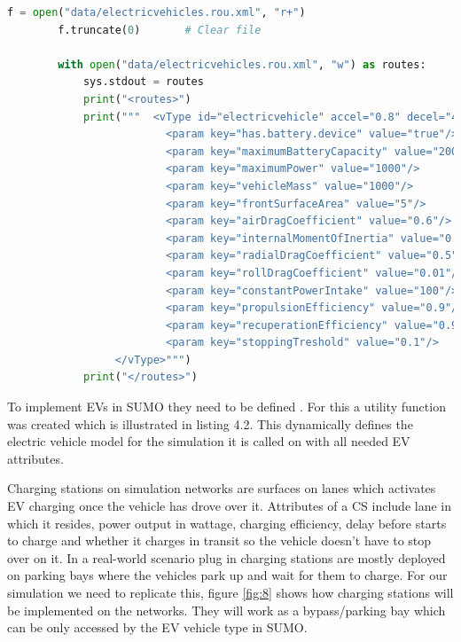 \documentclass[11pt]{report}
\begin{document}
\begin{lstlisting}[language=Python, caption=Utility function to define definition EVs]
        f = open("data/electricvehicles.rou.xml", "r+")
        f.truncate(0)       # Clear file
    
        with open("data/electricvehicles.rou.xml", "w") as routes:
            sys.stdout = routes
            print("<routes>")
            print("""  <vType id="electricvehicle" accel="0.8" decel="4.5" sigma="0.5" emissionClass="Energy/unknown" minGap="2.5" maxSpeed="40" guiShape="evehicle" vClass="evehicle">
                         <param key="has.battery.device" value="true"/>
                         <param key="maximumBatteryCapacity" value="2000"/>
                         <param key="maximumPower" value="1000"/>
                         <param key="vehicleMass" value="1000"/>
                         <param key="frontSurfaceArea" value="5"/>
                         <param key="airDragCoefficient" value="0.6"/>
                         <param key="internalMomentOfInertia" value="0.01"/>
                         <param key="radialDragCoefficient" value="0.5"/>
                         <param key="rollDragCoefficient" value="0.01"/>
                         <param key="constantPowerIntake" value="100"/>
                         <param key="propulsionEfficiency" value="0.9"/>
                         <param key="recuperationEfficiency" value="0.9"/>
                         <param key="stoppingTreshold" value="0.1"/>
                 </vType>""")
            print("</routes>")
\end{lstlisting}

To implement EVs in SUMO they need to be defined \autocite{sumoElectric}. For this a utility function was created which is illustrated in listing 4.2. This dynamically defines the electric vehicle model for the simulation it is called on with all needed EV attributes.

Charging stations on simulation networks are surfaces on lanes which activates EV charging once the vehicle has drove over it. Attributes of a CS include lane in which it resides, power output in wattage, charging efficiency, delay before starts to charge and whether it charges in transit so the vehicle doesn't have to stop over on it. In a real-world scenario plug in charging stations are mostly deployed on parking bays where the vehicles park up and wait for them to charge. For our simulation we need to replicate this, figure \ref{fig:8} shows how charging stations will be implemented on the networks. They will work as a bypass/parking bay which can be only accessed by the EV vehicle type in SUMO.
\end{document}
